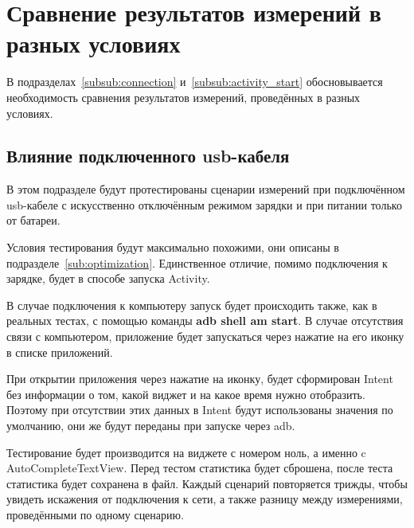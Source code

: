 \documentclass[a4paper,14pt]{extarticle} %
\begin{document}
	\clearpage
	\section{Сравнение результатов измерений в разных условиях}
	
	В подразделах~\ref{subsub:connection} и~\ref{subsub:activity_start} обосновывается необходимость сравнения результатов измерений, проведённых в разных условиях.
	
	\subsection{Влияние подключенного usb-кабеля} \label{sub:nousb_test}
	
	В этом подразделе будут протестированы сценарии измерений при подключённом usb-кабеле с искусственно отключённым режимом зарядки и при питании только от батареи.
	
	Условия тестирования будут максимально похожими, они описаны в подразделе~\ref{sub:optimization}. Единственное отличие, помимо подключения к зарядке, будет в способе запуска Activity. 
	
	В случае подключения к компьютеру запуск будет происходить также, как в реальных тестах, с помощью команды \textbf{adb shell am start}. В случае отсутствия связи с компьютером, приложение будет запускаться через нажатие на его иконку в списке приложений.
	
	При открытии приложения через нажатие на иконку, будет сформирован Intent без информации о том, какой виджет и на какое время нужно отобразить. Поэтому при отсутствии этих данных в Intent будут использованы значения по умолчанию, они же будут переданы при запуске через adb.
	
	Тестирование будет производится на виджете с номером ноль, а именно c AutoCompleteTextView. Перед тестом статистика будет сброшена, после теста статистика будет сохранена в файл. Каждый сценарий повторяется трижды, чтобы увидеть искажения от подключения к сети, а также разницу между измерениями, проведёнными по одному сценарию.
	
\end{document}
